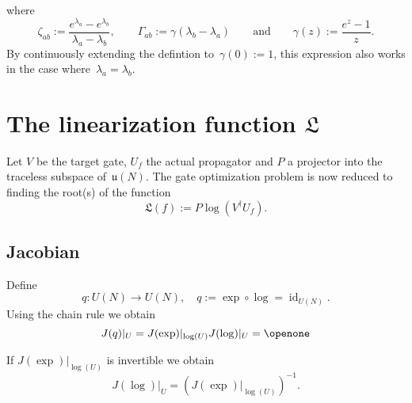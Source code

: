 \documentclass[aps,pra,12pt,showpacs,showkeys,nofootinbib,superscriptaddress,longbibliography]{revtex4}
\DeclareMathOperator{\id}{id} %
\newcommand{\I}{\openone}     %
\newcommand{\mf}[1]{\mathfrak{#1}}
\newcommand{\be}{\begin{equation}}
\newcommand{\ee}{\end{equation}}
\begin{document}
where
\be
\zeta_{ab} := \frac{e^{\lambda_a} - e^{\lambda_b}}{\lambda_a - \lambda_b},
\qquad
\Gamma_{ab} := \gamma(\lambda_b-\lambda_a) \qquad \text{and} \qquad
\gamma(z) := \frac{e^z - 1}{z}.
\ee
By continuously extending the defintion to~$\gamma(0) := 1$, this
expression also works in the case where~$\lambda_a = \lambda_b$.



\section{The linearization function $\mf{L}$}

Let $V$ be the target gate, $U_f$ the actual propagator and $P$ a
projector into the traceless subspace of~$\mf{u}(N)$. The gate
optimization problem is now reduced to finding the root(s) of the function
\be
\mf{L}(f) := P \log(V^\dagger U_f).
\ee




\subsection{Jacobian}


Define
\be
q: U(N) \to U(N), \quad q := \exp \circ \log = \id_{U(N)}.
\ee
Using the chain rule we obtain
\be
J(q)|_{U} = J(\exp)|_{\log(U)} J(\log)|_{U} = \I
\ee

If $J(\exp)|_{\log(U)}$ is invertible we obtain
\be
\label{eq:invJ}
J(\log)|_{U} =  (J(\exp)|_{\log(U)})^{-1}.
\ee
\end{document}
